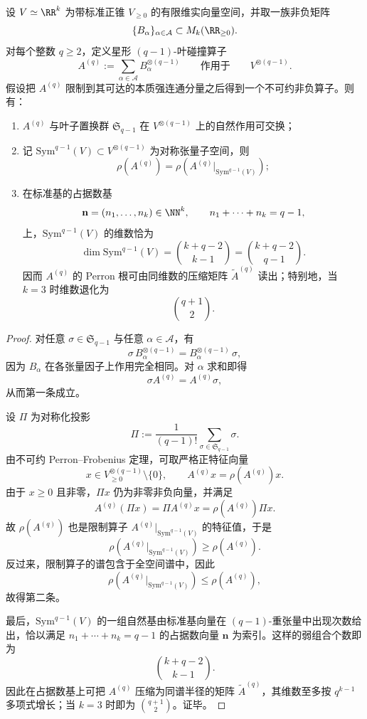 \begin{theorem}\label{thm:pom-star-moment-kernel-perron-symmetric-compression}
设 \(V\simeq \RR^{k}\) 为带标准正锥 \(V_{\ge 0}\) 的有限维实向量空间，并取一族非负矩阵
\[
\{B_\alpha\}_{\alpha\in\mathcal A}\subset M_k(\RR_{\ge 0}).
\]
对每个整数 \(q\ge 2\)，定义星形 \((q-1)\)-叶碰撞算子
\[
A^{(q)}:=\sum_{\alpha\in\mathcal A} B_\alpha^{\otimes (q-1)}
\qquad\text{作用于}\qquad
V^{\otimes(q-1)}.
\]
假设把 \(A^{(q)}\) 限制到其可达的本质强连通分量之后得到一个不可约非负算子。则有：
\begin{enumerate}
  \item \(A^{(q)}\) 与叶子置换群 \(\mathfrak S_{q-1}\) 在 \(V^{\otimes(q-1)}\) 上的自然作用可交换；
  \item 记 \(\mathrm{Sym}^{q-1}(V)\subset V^{\otimes(q-1)}\) 为对称张量子空间，则
  \[
  \rho\!\left(A^{(q)}\right)
  =
  \rho\!\left(A^{(q)}\big|_{\mathrm{Sym}^{q-1}(V)}\right);
  \]
  \item 在标准基的占据数基
  \[
  \mathbf n=(n_1,\dots,n_k)\in\NN^k,
  \qquad
  n_1+\cdots+n_k=q-1,
  \]
  上，\(\mathrm{Sym}^{q-1}(V)\) 的维数恰为
  \[
  \dim \mathrm{Sym}^{q-1}(V)=\binom{k+q-2}{k-1}=\binom{k+q-2}{q-1}.
  \]
  因而 \(A^{(q)}\) 的 Perron 根可由同维数的压缩矩阵
  \(\widetilde A^{(q)}\) 读出；特别地，当 \(k=3\) 时维数退化为
  \[
  \binom{q+1}{2}.
  \]
\end{enumerate}
\end{theorem}

\begin{proof}
对任意 \(\sigma\in \mathfrak S_{q-1}\) 与任意 \(\alpha\in\mathcal A\)，有
\[
\sigma\, B_\alpha^{\otimes(q-1)}
=
B_\alpha^{\otimes(q-1)}\,\sigma,
\]
因为 \(B_\alpha\) 在各张量因子上作用完全相同。对 \(\alpha\) 求和即得
\[
\sigma A^{(q)}=A^{(q)}\sigma,
\]
从而第一条成立。

设 \(\Pi\) 为对称化投影
\[
\Pi:=\frac{1}{(q-1)!}\sum_{\sigma\in\mathfrak S_{q-1}}\sigma.
\]
由不可约 Perron--Frobenius 定理，可取严格正特征向量
\[
x\in V^{\otimes(q-1)}_{\ge 0}\setminus\{0\},
\qquad
A^{(q)}x=\rho\!\left(A^{(q)}\right)x.
\]
由于 \(x\ge 0\) 且非零，\(\Pi x\) 仍为非零非负向量，并满足
\[
A^{(q)}(\Pi x)
=
\Pi A^{(q)}x
=
\rho\!\left(A^{(q)}\right)\Pi x.
\]
故 \(\rho(A^{(q)})\) 也是限制算子 \(A^{(q)}|_{\mathrm{Sym}^{q-1}(V)}\) 的特征值，于是
\[
\rho\!\left(A^{(q)}\big|_{\mathrm{Sym}^{q-1}(V)}\right)\ge \rho\!\left(A^{(q)}\right).
\]
反过来，限制算子的谱包含于全空间谱中，因此
\[
\rho\!\left(A^{(q)}\big|_{\mathrm{Sym}^{q-1}(V)}\right)\le \rho\!\left(A^{(q)}\right),
\]
故得第二条。

最后，\(\mathrm{Sym}^{q-1}(V)\) 的一组自然基由标准基向量在 \((q-1)\)-重张量中出现次数给出，恰以满足
\(
n_1+\cdots+n_k=q-1
\)
的占据数向量 \(\mathbf n\) 为索引。这样的弱组合个数即为
\[
\binom{k+q-2}{k-1}.
\]
因此在占据数基上可把 \(A^{(q)}\) 压缩为同谱半径的矩阵 \(\widetilde A^{(q)}\)，其维数至多按 \(q^{k-1}\) 多项式增长；当 \(k=3\) 时即为 \(\binom{q+1}{2}\)。证毕。
\end{proof}
